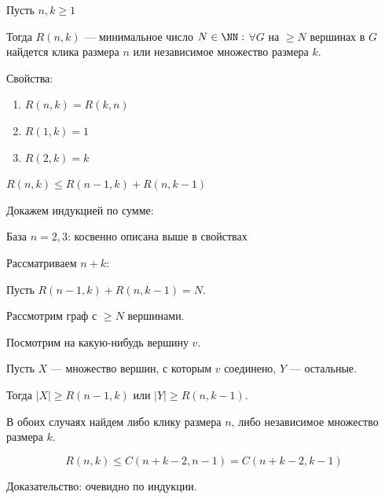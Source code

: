 \begin{defn}{}{}
    Пусть \( n, k \geq 1\)

    Тогда \( R(n, k) \) --- минимальное число \( N \in \NN : \)
    \( \forall G \) на \( \geq N \) вершинах в \( G \) найдется клика размера \( n \)
    или независимое множество размера \( k \).
\end{defn}

Свойства:
\begin{enumerate}
    \item
        \( R(n, k) = R(k, n) \)
    \item
        \( R(1, k) = 1 \)
    \item
        \( R(2, k) = k \)
\end{enumerate}

\begin{thrm}{}{}
    \( R(n, k) \leq R(n - 1, k) + R(n, k - 1) \)
\end{thrm}

Докажем индукцией по сумме:

База \( n = 2, 3 \): косвенно описана выше в свойствах

Рассматриваем \( n + k \):

Пусть \( R(n - 1, k) + R(n, k - 1) = N \).

Рассмотрим граф с \( \geq N \) вершинами.

Посмотрим на какую-нибудь вершину \( v \).

Пусть \( X \) --- множество вершин, с которым \( v \) соединено, \( Y \) --- остальные.

Тогда \( |X| \geq R(n - 1, k) \) или \( |Y| \geq R(n, k - 1) \).

В обоих случаях найдем либо клику размера \( n \), либо независимое множество размера \( k \).

\begin{coroll}{}{}
    \[
        R(n, k) \leq C(n + k - 2, n - 1) = C(n + k - 2, k - 1)
    \]
\end{coroll}

Доказательство: очевидно по индукции.

